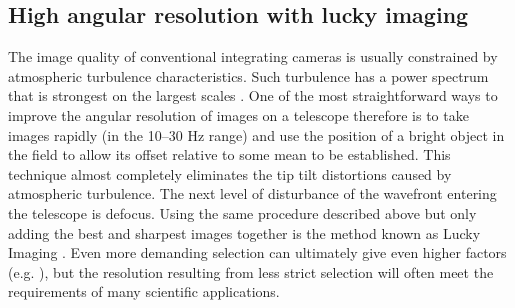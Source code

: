 \documentclass{pasa}%
\begin{document}










\subsection{High angular resolution with lucky imaging}

The image quality of conventional integrating cameras is usually constrained by atmospheric turbulence
characteristics.  Such turbulence has a power spectrum that is strongest on the largest scales \citep{Fried}. One of the most straightforward ways to improve the angular resolution of images on a telescope therefore is to take images rapidly (in the 10--30 Hz range) and use the position of a bright object in the field to allow its offset relative to some mean to be established.  
This technique almost completely eliminates the tip tilt distortions caused by atmospheric turbulence. 
The next level of disturbance of the wavefront entering the telescope is defocus.  Using the same procedure described above but only adding the best and sharpest images together is the method known as Lucky Imaging \citep{Mackay+2004}. Even more demanding selection can ultimately give even higher factors (e.g. \citealt{Baldwin+2008}), but the resolution resulting from less strict selection will often meet the requirements of many scientific applications.
\end{document}
